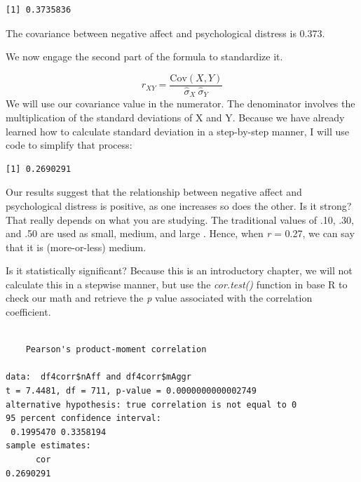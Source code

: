 \documentclass[
  11pt,
]{book}
\newenvironment{Shaded}{\begin{snugshade}}{\end{snugshade}}
\newcommand{\FunctionTok}[1]{\textcolor[rgb]{0.00,0.00,0.00}{#1}}
\newcommand{\NormalTok}[1]{#1}
\newcommand{\SpecialCharTok}[1]{\textcolor[rgb]{0.00,0.00,0.00}{#1}}
\begin{document}
\begin{verbatim}
[1] 0.3735836
\end{verbatim}

The covariance between negative affect and psychological distress is 0.373.

We now engage the second part of the formula to standardize it.

\[
r_{XY}  = \frac{\mbox{Cov}(X,Y)}{ \hat{\sigma}_X \ \hat{\sigma}_Y}
\]
We will use our covariance value in the numerator. The denominator involves the multiplication of the standard deviations of X and Y. Because we have already learned how to calculate standard deviation in a step-by-step manner, I will use code to simplify that process:

\begin{Shaded}
\end{Shaded}

\begin{verbatim}
[1] 0.2690291
\end{verbatim}

Our results suggest that the relationship between negative affect and psychological distress is positive, as one increases so does the other. Is it strong? That really depends on what you are studying. The traditional values of .10, .30, and .50 are used as small, medium, and large \citep{cohen_applied_2003}. Hence, when \emph{r} = 0.27, we can say that it is (more-or-less) medium.

Is it statistically significant? Because this is an introductory chapter, we will not calculate this in a stepwise manner, but use the \emph{cor.test()} function in base R to check our math and retrieve the \emph{p} value associated with the correlation coefficient.

\begin{Shaded}
\end{Shaded}

\begin{verbatim}

    Pearson's product-moment correlation

data:  df4corr$nAff and df4corr$mAggr
t = 7.4481, df = 711, p-value = 0.0000000000002749
alternative hypothesis: true correlation is not equal to 0
95 percent confidence interval:
 0.1995470 0.3358194
sample estimates:
      cor 
0.2690291 
\end{verbatim}
\end{document}
